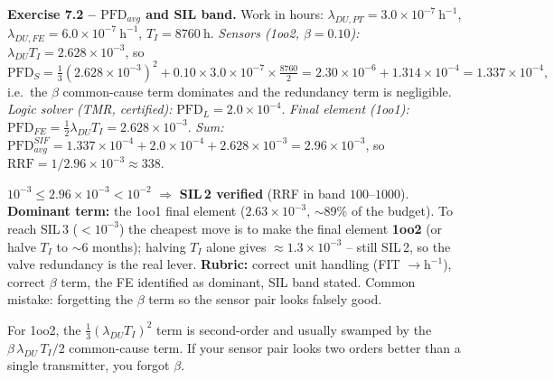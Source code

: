 \documentclass[11pt,a4paper]{article}
\begin{document}
\begin{solutionbox}
\textbf{Exercise 7.2 -- $\mathrm{PFD}_{avg}$ and SIL band.}
Work in hours: $\lambda_{DU,PT}=3.0\times10^{-7}\ \mathrm{h^{-1}}$,
$\lambda_{DU,FE}=6.0\times10^{-7}\ \mathrm{h^{-1}}$, $T_I=8760\ \mathrm{h}$.
\emph{Sensors (1oo2, $\beta=0.10$):} $\lambda_{DU}T_I=2.628\times10^{-3}$, so
\[
\mathrm{PFD}_S=\tfrac{1}{3}(2.628\times10^{-3})^2
   + 0.10\times 3.0\times10^{-7}\times\tfrac{8760}{2}
   =2.30\times10^{-6}+1.314\times10^{-4}=1.337\times10^{-4},
\]
i.e.\ the $\beta$ common-cause term dominates and the redundancy term is
negligible. \emph{Logic solver (TMR, certified):}
$\mathrm{PFD}_L=2.0\times10^{-4}$. \emph{Final element (1oo1):}
$\mathrm{PFD}_{FE}=\tfrac{1}{2}\lambda_{DU}T_I=2.628\times10^{-3}$.
\emph{Sum:}
$\mathrm{PFD}_{avg}^{SIF}=1.337\times10^{-4}+2.0\times10^{-4}
+2.628\times10^{-3}=2.96\times10^{-3}$, so
$\mathrm{RRF}=1/2.96\times10^{-3}\approx 338$.

\smallskip
$10^{-3}\le 2.96\times10^{-3}<10^{-2}$ $\Rightarrow$ \textbf{SIL\,2 verified}
(RRF in band $100$--$1000$). \textbf{Dominant term:} the 1oo1 final element
($2.63\times10^{-3}$, $\sim$89\% of the budget). To reach SIL\,3 ($<10^{-3}$)
the cheapest move is to make the final element \textbf{1oo2} (or halve $T_I$ to
$\sim$6 months); halving $T_I$ alone gives $\approx1.3\times10^{-3}$ -- still
SIL\,2, so the valve redundancy is the real lever.
\textbf{Rubric:} correct unit handling (FIT $\to\mathrm{h^{-1}}$), correct
$\beta$ term, the FE identified as dominant, SIL band stated. Common mistake:
forgetting the $\beta$ term so the sensor pair looks falsely good.
\end{solutionbox}

\begin{hintbox}
For 1oo2, the $\tfrac{1}{3}(\lambda_{DU}T_I)^2$ term is second-order and
usually swamped by the $\beta\,\lambda_{DU}\,T_I/2$ common-cause term. If your
sensor pair looks two orders better than a single transmitter, you forgot
$\beta$.
\end{hintbox}
\end{document}
